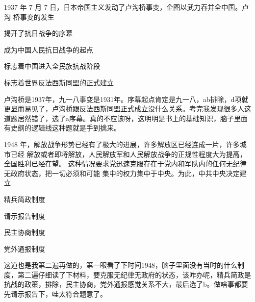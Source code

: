 \documentclass[lang=cn,blue,10pt,scheme=chinese,twocol]{zznote}
\begin{document}
\begin{exercise}1937 年 7 月 7 日，日本帝国主义发动了卢沟桥事变，企图以武力吞并全中国。卢沟 桥事变的发生
	\begin{choice}
		\item 揭开了抗日战争的序幕
		\item 成为中国人民抗日战争的起点
		\item 标志着中国进入全民族抗战阶段
		\item 标志着世界反法西斯同盟的正式建立
	\end{choice}
\end{exercise}
\begin{solution}
	卢沟桥是1937年，九一八事变是1931年。序幕起点肯定是九一八，ab排除，d项就更显而易见了，卢沟桥跟反法西斯同盟正式成立没什么关系。考完我发现很多人这道题居然错了，选了a序幕。真的不应该呀，这明明是书上的基础知识，脑子里面有史纲的逻辑线这种题就是手到擒来。
\end{solution}


\begin{exercise}1948 年，解放战争形势已经有了极大的进展，许多解放区已经连成一片，许多城市已经 解放或者即将解放，人民解放军和人民解放战争的正规性程度大为提高，全国胜利已经在望。 这种情况要求党迅速克服存在于党内和军队内的任何无纪律无政府状态，把一切必须和可能 集中的权力集中于中央。为此，中共中央决定建立
	\begin{choice}
		\item 精兵简政制度
		\item 请示报告制度
		\item 民主协商制度
		\item 党外通报制度
	\end{choice}
\end{exercise}
\begin{solution}
	这道也是我第二遍再做的，第一眼看了下时间1948，脑子里面没有当时的什么制度，第二遍仔细读了下材料，要克服无纪律无政府的状态，该咋办呢，精兵简政是抗战的政策，排除，民主协商，党外通报感觉关系不大，最后选了b。做啥事都要先请示报告下，哇太符合题意了。
\end{solution}
\end{document}
